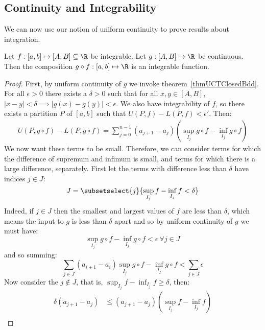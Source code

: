 \documentclass[../Main.tex]{subfiles}
\begin{document}
\subsection{Continuity and Integrability}
We can now use our notion of uniform continuity to prove results about integration.
\begin{theorem}
    Let $f : [a, b] \mapsto [A, B] \subseteq \R$ be integrable. Let $g : [A, B] \mapsto \R$ be continuous. Then the composition $g \circ f : [a, b] \mapsto \R$ is an integrable function.
    \label{thmCtsComposeIBL}
\end{theorem}
\begin{proof}
    First, by uniform continuity of $g$ we invoke theorem~\ref{thmUCTClosedBdd}. For all $\epsilon > 0$ there exists a $\delta > 0$ such that for all $x, y \in [A, B]$, $|x - y| < \delta \implies |g(x) - g(y)| < \epsilon$.
    We also have integrability of $f$, so there exists a partition $P$ of $[a, b]$ such that $U(P, f) - L(P, f) < \epsilon'$. Then:
    \begin{align*}
        U(P, g\circ f) - L(P, g \circ f) = \sum_{j=0}^{n - 1} (a_{j+1} - a_j) \left(\sup_{I_j} g\circ f - \inf_{I_j} g \circ f\right)
    \end{align*}
    We now want these terms to be small. Therefore, we can consider terms for which the difference of supremum and infimum is small, and terms for which there is a large difference, separately. First let the terms with difference less than $\delta$ have indices $j \in J$:
    \begin{equation*}
        J = \subsetselect{j}{\sup_{I_j} f - \inf_{I_j} f < \delta}
    \end{equation*}
    Indeed, if $j \in J$ then the smallest and largest values of $f$ are less than $\delta$, which means the input to $g$ is less than $\delta$ apart and so by uniform continuity of $g$ we must have:
    \begin{equation*}
        \sup_{I_j} g\circ f - \inf_{I_j} g\circ f < \epsilon~\forall j \in J
    \end{equation*}
    and so summing:
    \begin{equation}
        \sum_{j \in J} (a_{i+1} - a_i) \sup_{I_j} g\circ f - \inf_{I_j} g\circ f < \sum_{j \in J} \epsilon
        \label{eqnContinuityBound}
    \end{equation}
    Now consider the $j \notin J$, that is, $\sup_{I_j} f - \inf_{I_j} f \geq \delta$, then:
    \begin{align*}
        \delta (a_{j+1} - a_j) &\leq (a_{j+1} - a_j) \left(\sup_{I_j} f - \inf_{I_j} f\right) \\

\end{align*}
\end{proof}
\end{document}

